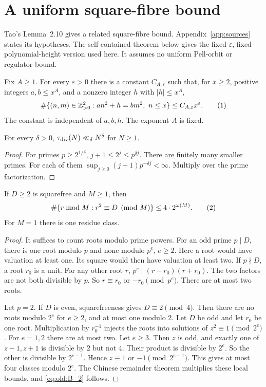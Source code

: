 \section{A uniform square-fibre bound}\label{app:fibre}

Tao's Lemma~2.10 \cite[Lemma~2.10]{Tao} gives a related square-fibre
bound. Appendix~\ref{app:sources} states its hypotheses. The self-contained
theorem below gives the
fixed-\(\varepsilon\), fixed-polynomial-height version used here. It assumes
no uniform Pell-orbit or regulator bound.

\begin{theorem}\label{thm:fibre}
Fix \(A\ge1\). For every \(\varepsilon>0\) there is a constant
\(C_{A,\varepsilon}\) such that, for \(x\ge2\), positive integers
\(a,b\le x^A\), and a nonzero integer \(h\) with \(|h|\le x^A\),
\[
 \#\{(n,m)\in\mathbb Z_{>0}^2:
       an^2+h=bm^2,\ n\le x\}
 \le C_{A,\varepsilon}x^\varepsilon.
\AutoTag{eq:old:B_1}
\]
The constant is independent of \(a,b,h\). The exponent \(A\) is fixed.
\end{theorem}

\begin{lemma}\label{lem:tau}
For every \(\delta>0\), \(\tau_{\mathrm{div}}(N)\ll_\delta N^\delta\) for \(N\ge1\).
\end{lemma}
\begin{proof}
For primes \(p\ge2^{1/\delta}\), \(j+1\le2^j\le p^{\delta j}\).
There are finitely many smaller primes. For each of them
\(\sup_{j\ge0}(j+1)p^{-\delta j}<\infty\). Multiply over the
prime factorization.
\end{proof}

\begin{lemma}\label{lem:qroots}
If \(D\ge2\) is squarefree and \(M\ge1\), then
\[
\#\{r\bmod M:r^2\equiv D\pmod M\}\le4\cdot2^{\omega(M)}.
\AutoTag{eq:old:B_2}
\]
For \(M=1\) there is one residue class.
\end{lemma}
\begin{proof}
It suffices to count roots modulo prime powers. For an odd prime \(p\mid D\),
there is one root modulo \(p\) and none modulo \(p^e\), \(e\ge2\). Here
a root would have valuation at least one. Its square would then have
valuation at least two. If \(p\nmid D\), a root \(r_0\) is a unit. For any other
root \(r\), \(p^e\mid(r-r_0)(r+r_0)\). The two factors are not both
divisible by \(p\). So \(r\equiv r_0\) or \(-r_0\pmod{p^e}\).
There are at most two roots.

Let \(p=2\). If \(D\) is even, squarefreeness gives \(D\equiv2\pmod4\).
Then there are no roots modulo \(2^e\) for \(e\ge2\), and at most one modulo
2. Let \(D\) be odd and let \(r_0\) be one root. Multiplication by
\(r_0^{-1}\) injects the roots into solutions of \(z^2\equiv1\pmod{2^e}\).
For \(e=1,2\) there are at most two. Let \(e\ge3\). Then \(z\) is odd, and
exactly one of \(z-1,z+1\) is divisible by \(2\) but not \(4\).
Their product is divisible by \(2^e\). So the other is divisible by
\(2^{e-1}\). Hence \(z\equiv1\) or \(-1\pmod{2^{e-1}}\). This gives at most
four classes modulo \(2^e\). The Chinese remainder theorem multiplies
these local bounds, and \eqref{eq:old:B_2} follows.
\end{proof}

